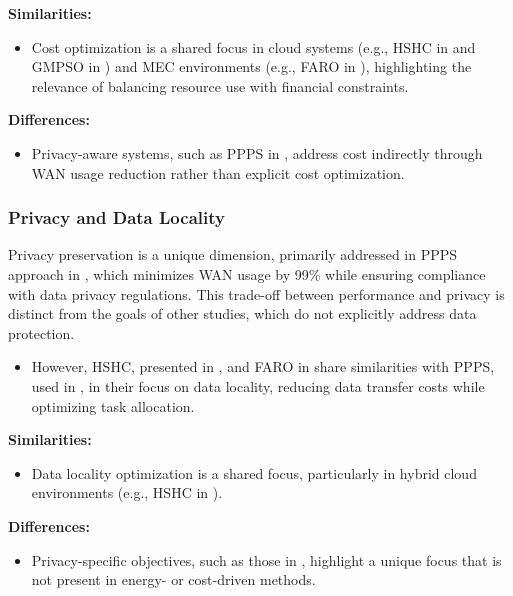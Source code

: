 \documentclass[a4paper, final]{article}
\begin{document}
\noindent \textbf{Similarities:}
\begin{itemize}
    \item Cost optimization is a shared focus in cloud systems (e.g., HSHC in \cite{bib:9} and GMPSO in \cite{bib:10})
    and MEC environments (e.g., FARO in \cite{bib:2_faro}), highlighting the relevance of balancing resource use with financial 
    constraints.
\end{itemize}

\noindent \textbf{Differences:}
\begin{itemize}
    \item Privacy-aware systems, such as PPPS in \cite{bib:7_ppps}, address cost indirectly 
    through WAN usage reduction rather than explicit cost optimization.
\end{itemize}

\subsubsection{Privacy and Data Locality}
Privacy preservation is a unique dimension, primarily addressed in PPPS approach in \cite{bib:7_ppps}, 
which minimizes WAN usage by 99\% while ensuring compliance with data privacy regulations. This 
trade-off between performance and privacy is distinct from the goals of other studies, which do not 
explicitly address data protection.
\begin{itemize}
    \item However, HSHC, presented in \cite{bib:9}, and FARO in \cite{bib:2_faro} share similarities 
    with PPPS, used in \cite{bib:7_ppps}, in their focus on data locality, reducing data transfer costs while 
    optimizing task allocation.
\end{itemize}

\noindent \textbf{Similarities:}
\begin{itemize}
    \item Data locality optimization is a shared focus, particularly in hybrid cloud environments 
    (e.g., HSHC in \cite{bib:9}).
\end{itemize}

\noindent \textbf{Differences:}
\begin{itemize}
    \item Privacy-specific objectives, such as those in \cite{bib:7_ppps}, highlight a unique focus that is not 
    present in energy- or cost-driven methods.
\end{itemize}
\end{document}
